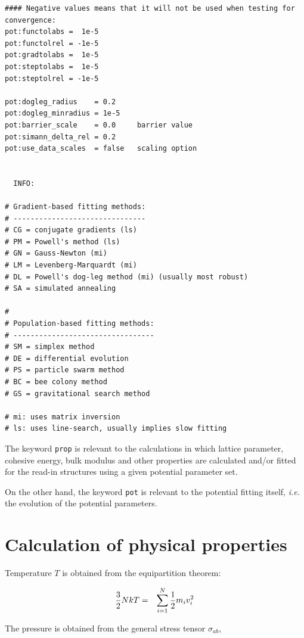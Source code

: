\documentclass[a4paper,12pt,pdftex,onecolumn]{article}
\newcommand{\ie}{\emph{i.e.}\xspace}
\begin{document}
\begin{Verbatim}[fontsize=\relsize{-1},frame=single]
#### Negative values means that it will not be used when testing for convergence:
pot:functolabs =  1e-5
pot:functolrel = -1e-5
pot:gradtolabs =  1e-5
pot:steptolabs =  1e-5
pot:steptolrel = -1e-5

pot:dogleg_radius    = 0.2
pot:dogleg_minradius = 1e-5
pot:barrier_scale    = 0.0     barrier value
pot:simann_delta_rel = 0.2
pot:use_data_scales  = false   scaling option


  INFO:

# Gradient-based fitting methods:
# -------------------------------
# CG = conjugate gradients (ls)
# PM = Powell's method (ls)
# GN = Gauss-Newton (mi)
# LM = Levenberg-Marquardt (mi)
# DL = Powell's dog-leg method (mi) (usually most robust)
# SA = simulated annealing

#
# Population-based fitting methods:
# ---------------------------------
# SM = simplex method
# DE = differential evolution
# PS = particle swarm method
# BC = bee colony method
# GS = gravitational search method

# mi: uses matrix inversion
# ls: uses line-search, usually implies slow fitting

\end{Verbatim}



The keyword \verb+prop+ is relevant to the calculations in which
lattice parameter, cohesive energy, bulk modulus and other
properties are calculated and/or fitted for the read-in structures
using a given potential parameter set.

On the other hand, the keyword \verb+pot+ is relevant to the
potential fitting itself, \ie the evolution of the potential
parameters.









\section{Calculation of physical properties}

Temperature $T$ is obtained from the equipartition theorem:

\begin{eqnarray}
{3 \over 2} N kT &=& \sum_{i=1}^N {1\over 2} m_i v_i^2
\end{eqnarray}

The pressure is obtained from the general stress tensor $\sigma_{ab}$,
\end{document}
